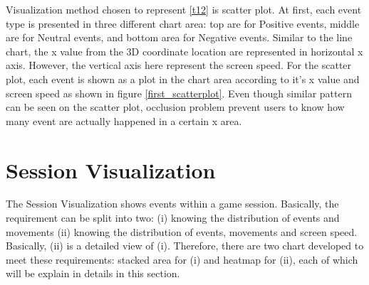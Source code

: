Visualization method chosen to represent \ref{t12} is scatter plot. At first, each event type is presented in three different chart area: top are for Positive events, middle are for Neutral events, and bottom area for Negative events. Similar to the line chart, the x value from the 3D coordinate location are represented in horizontal x axis. However, the vertical axis here represent the screen speed. For the scatter plot, each event is shown as a plot in the chart area according to it's x value and screen speed as shown in figure \ref{first_scatterplot}. Even though similar pattern can be seen on the scatter plot, occlusion problem prevent users to know how many event are actually happened in a certain x area.

\section{Session Visualization}
The Session Visualization shows events within a game session. Basically, the requirement can be split into two: (i) knowing the distribution of events and movements (ii) knowing the distribution of events, movements and screen speed. Basically, (ii) is a detailed view of (i). Therefore, there are two chart developed to meet these requirements: stacked area for (i) and heatmap for (ii), each of which will be explain in details in this section.

